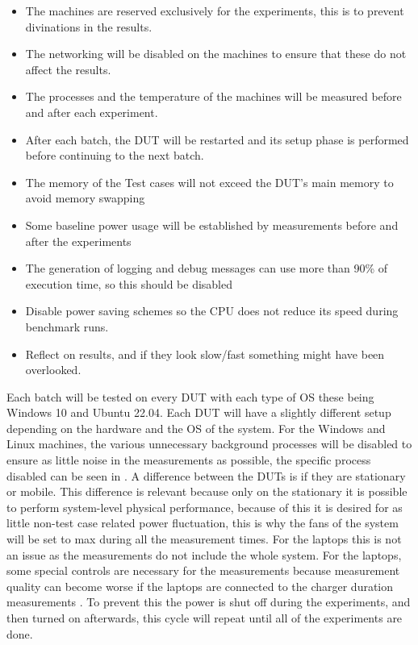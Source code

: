 \begin{itemize}
    \item The machines are reserved exclusively for the experiments, this is to prevent divinations in the results.
    \item The networking will be disabled on the machines to ensure that these do not affect the results.
    \item The processes and the temperature of the machines will be measured before and after each experiment.
    \item After each batch, the DUT will be restarted and its setup phase is performed before continuing to the next batch.
    \item The memory of the Test cases will not exceed the DUT's main memory to avoid memory swapping
    \item Some baseline power usage will be established by measurements before and after the experiments
    \item The generation of logging and debug messages can use more than 90\% of execution time, so this should be disabled
    \item Disable power saving schemes so the CPU does not reduce its speed during benchmark runs.
    \item Reflect on results, and if they look slow/fast something might have been overlooked.
\end{itemize}

Each batch will be tested on every DUT with each type of OS these being Windows 10 and Ubuntu 22.04. Each DUT will have a slightly different setup depending on the hardware and the OS of the system. For the Windows and Linux machines, the various unnecessary background processes will be disabled to ensure as little noise in the measurements as possible\cite*[]{sestoft2013microbenchmarks}, the specific process disabled can be seen in . A difference between the DUTs is if they are stationary or mobile. This difference is relevant because only on the stationary it is possible to perform system-level physical performance, because of this it is desired for as little non-test case related power fluctuation, this is why the fans of the system will be set to max during all the measurement times. For the laptops this is not an issue as the measurements do not include the whole system. For the laptops, some special controls are necessary for the measurements because measurement quality can become worse if the laptops are connected to the charger duration measurements \cite{E3Video}. To prevent this the power is shut off during the experiments, and then turned on afterwards, this cycle will repeat until all of the experiments are done.


